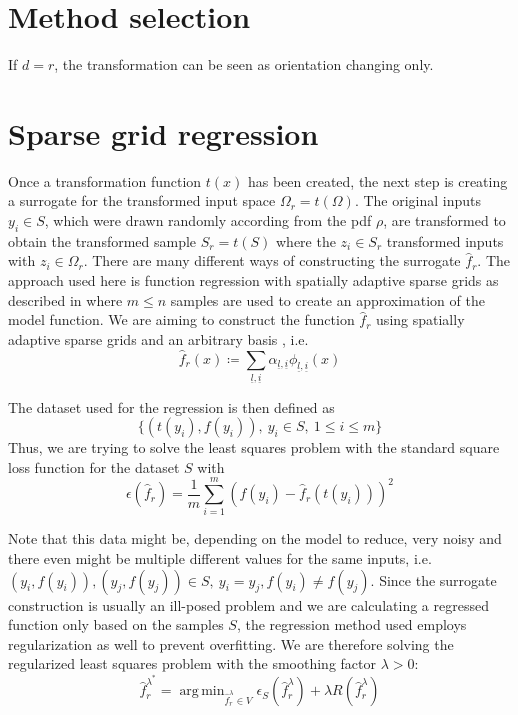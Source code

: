 \documentclass[
  a4paper,  %
  twoside,  %
  bibliography=totoc,
  headsepline,
  cleardoublepage=empty,
  parskip=half,
  draft=false
]{scrbook}
\DeclareMathOperator*{\argmin}{arg\,min}
\begin{document}
\section{Method selection}

If $d=r$, the transformation can be seen as orientation changing only.

\section{Sparse grid regression}

Once a transformation function $t(x)$ has been created, the next step is creating a surrogate for the transformed input space $\Omega_r=t(\Omega)$.
The original inputs $y_i \in S$, which were drawn randomly according from the pdf $\rho$, are transformed to obtain the transformed sample $S_r=t(S)$ where the $z_i \in S_r$ transformed inputs with $z_i \in \Omega_r$.
There are many different ways of constructing the surrogate $\hat{f}_r$.
The approach used here is function regression with spatially adaptive sparse grids as described in \cite{P10} where $m \leq n$ samples are used to create an approximation of the model function.
We are aiming to construct the function $\hat{f}_r$ using spatially adaptive sparse grids and an arbitrary basis , i.e.
\begin{equation}
\hat{f}_r(x) \coloneqq \sum_{\underline{l},\underline{i}} \alpha_{\underline{l},\underline{i}} \phi_{\underline{l},\underline{i}}(x)
\end{equation}

The dataset used for the regression is then defined as
\begin{equation}
\{(t(y_i),f(y_i)), ~ y_i \in S, ~ 1 \leq i \leq m\}
\end{equation}
Thus, we are trying to solve the least squares problem with the standard square loss function for the dataset $S$ with
\begin{equation}
\epsilon(\hat{f}_r)=\frac{1}{m} \sum_{i=1}^m (f(y_i) - \hat{f}_r(t(y_i)))^2 
\end{equation}

Note that this data might be, depending on the model to reduce, very noisy and there even might be multiple different values for the same inputs, i.e. $(y_i,f(y_i)), (y_j,f(y_j)) \in S, ~ y_i=y_j, f(y_i) \neq f(y_j)$.
Since the surrogate construction is usually an ill-posed problem and we are calculating a regressed function only based on the samples $S$, the regression method used employs regularization as well to prevent overfitting.
We are therefore solving the regularized least squares problem with the smoothing factor $\lambda > 0$:
\begin{equation}
\hat{f}_r^{\lambda^*} = \argmin_{\hat{f}_r^\lambda \in V} \epsilon_{S}(\hat{f}_r^\lambda) + \lambda R(\hat{f}_r^\lambda)
\end{equation}
\end{document}
